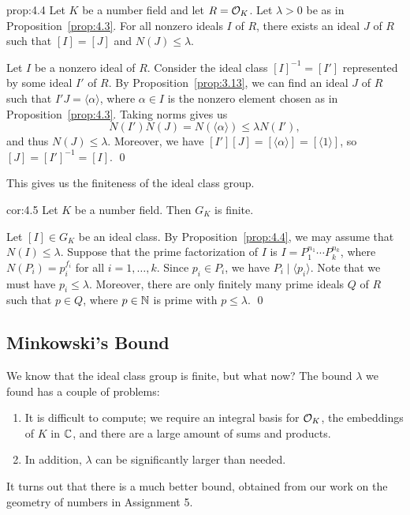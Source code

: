 \begin{prop}{prop:4.4}
    Let $K$ be a number field and let $R = {\cal O}_K$. Let $\lambda > 0$ 
    be as in Proposition~\ref{prop:4.3}. For all nonzero ideals $I$ of $R$, 
    there exists an ideal $J$ of $R$ such that $[I] = [J]$ and $N(J) \leq \lambda$. 
\end{prop}\vspace{-0.25cm}
\begin{pf}
    Let $I$ be a nonzero ideal of $R$. Consider the ideal class $[I]^{-1} = 
    [I']$ represented by some ideal $I'$ of $R$. By Proposition~\ref{prop:3.13},
    we can find an ideal $J$ of $R$ such that $I'J = \langle \alpha \rangle$, 
    where $\alpha \in I$ is the nonzero element chosen as in 
    Proposition~\ref{prop:4.3}. Taking norms gives us 
    \[ N(I') N(J) = N(\langle \alpha \rangle) \leq \lambda N(I'), \] 
    and thus $N(J) \leq \lambda$. Moreover, we have $[I'][J] 
    = [\langle \alpha \rangle] = [\langle 1 \rangle]$, so 
    $[J] = [I']^{-1} = [I]$. \qed 
\end{pf}\vspace{-0.25cm}

This gives us the finiteness of the ideal class group. 

\begin{cor}{cor:4.5}
    Let $K$ be a number field. Then $G_K$ is finite. 
\end{cor}\vspace{-0.25cm}
\begin{pf}
    Let $[I] \in G_K$ be an ideal class. By Proposition~\ref{prop:4.4}, 
    we may assume that $N(I) \leq \lambda$. Suppose that the 
    prime factorization of $I$ is $I = P_1^{n_1} \cdots P_k^{n_k}$,
    where $N(P_i) = p_i^{f_i}$ for all $i = 1, \dots, k$. Since $p_i \in P_i$, 
    we have $P_i \mid \langle p_i \rangle$. Note that we must have 
    $p_i \leq \lambda$. Moreover, there are only finitely many 
    prime ideals $Q$ of $R$ such that $p \in Q$, where $p \in \mathbb{N}$ is prime 
    with $p \leq \lambda$. \qed 
\end{pf}\newpage 

\subsection{Minkowski's Bound} \label{subsec:4.2}
We know that the ideal class group is finite, but what now? The bound 
$\lambda$ we found has a couple of problems: 
\begin{enumerate}[(1)]
    \item It is difficult to compute; we require an integral basis
    for ${\cal O}_K$, the embeddings of $K$ in $\mathbb{C}$, and there are a large 
    amount of sums and products.
    \item In addition, $\lambda$ can be significantly larger than needed. 
\end{enumerate}
It turns out that there is a much better bound, obtained from 
our work on the geometry of numbers in Assignment 5. 

